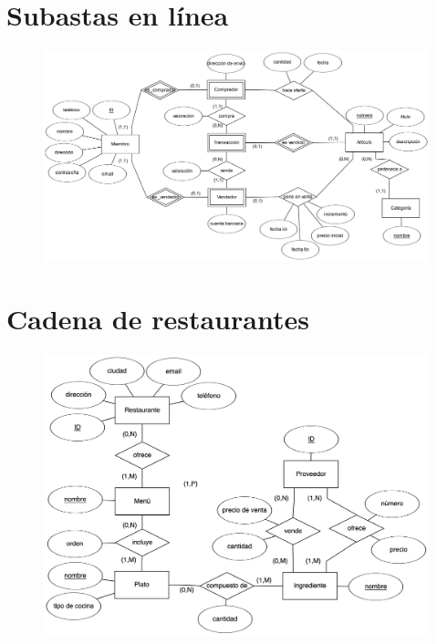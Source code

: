 \documentclass[a4paper]{article}
\begin{document}
\section{Subastas en línea}
\begin{figure}[H]
    \centering
    \includegraphics[width=\textwidth]{figs/ejercicio-10}
\end{figure}

\section{Cadena de restaurantes}
\begin{figure}[H]
    \centering
    \includegraphics[width=\textwidth]{figs/ejercicio-11}
\end{figure}
\end{document}
